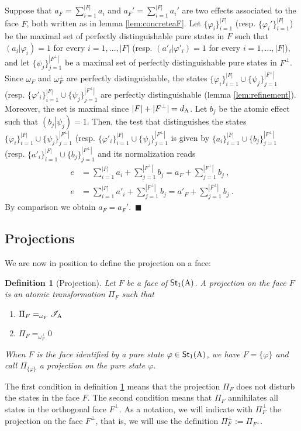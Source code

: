\documentclass[12pt,aps,pra,showpacs,groupedaddress]{revtex4-1}
\newtheorem{definition}{Definition}
\def\Proof{\medskip\par\noindent{\bf Proof. }}
\def\qed{$\,\blacksquare$\par}
\def\Stset{{\mathsf{St}}}
\def\SC#1#2{\left(#1\right|\left.\!#2\right)}  \def\Tr{{\rm Tr}}
\begin{document}
\Proof Suppose that $a_F= \sum_{i=1}^{|F|} a_i$ and $a_F' =
\sum_{i=1}^{|F|} a_i'$ are two effects associated to the face $F$,
both written as in lemma \ref{lem:concreteaF}.  Let
$\{\varphi_i\}_{i=1}^{|F|}$ (resp. $\{\varphi_i'\}_{i=1}^{|F|}$) be
the maximal set of perfectly distinguishable pure states in $F$ such
that $\SC {a_i}{\varphi_i} = 1$ for every $i=1, \dots, |F|$ (resp.
$\SC {a'_i}{\varphi'_i} = 1$ for every $i=1, \dots, |F|$), and let
$\{\psi_j\}_{j=1}^{|F^\perp|}$ be a maximal set of perfectly
distinguishable pure states in $F^\perp$. Since $\omega_F$ and
$\omega_{F}^\perp$ are perfectly distinguishable, the states
$\{\varphi_i\}_{i=1}^{|F| } \cup \{\psi_j\}_{j=1}^{|F^\perp|} $ (resp.
$\{\varphi'_i\}_{i=1}^{|F| } \cup \{\psi_j\}_{j=1}^{|F^\perp|} $ are
perfectly distinguishable (lemma \ref{lem:refinement}).  Moreover, the
set is maximal since $|F| + |F^\perp| = d_{\rm A}$.  Let $b_j$ be the
atomic effect such that $\SC {b_j}{\psi_j} =1$.  Then, the test that
distinguishes the states $\{\varphi_i\}_{i=1}^{|F|} \cup
\{\psi_j\}_{j=1}^{|F^\perp|} $ (resp.  $\{\varphi'_i\}_{i=1}^{|F|}
\cup \{\psi_j\}_{j=1}^{|F^\perp|} $ is given by $\{a_i\}_{i=1}^{|F|}
\cup \{b_j\}_{j=1}^{|F^\perp|} $ (resp.  $\{a'_i\}_{i=1}^{|F|} \cup
\{b_j\}_{j=1}^{|F^\perp|}$ and its normalization reads
\begin{align*}
  e &=  \sum_{i=1}^{|F|}  a_i  + \sum_{j=1}^{|F^\perp|}  b_j  = a_F  +     \sum_{j=1}^{|F^\perp|}  b_j ~,\\
  e & = \sum_{i=1}^{|F|} a'_i + \sum_{j=1}^{|F^\perp|} b_j = a'_F +
  \sum_{j=1}^{|F^\perp|} b_j ~.
\end{align*}
By comparison we obtain $a_F = a_F'$.  \qed
 




\subsection{Projections}
We are now in position to define the projection on a face:
\begin{definition}[Projection]
  Let $F$ be a face of $\Stset_1(\rA)$. A {\em projection} on the face
  $F$ is an atomic transformation $\Pi_F$ such that
  \begin{enumerate}
  \item $\Pi_F=_{\omega_F} \mathscr I_{\rm A}$
  \item $\Pi_{F}=_{\omega^\perp_{F}}0$
  \end{enumerate}
  \label{def:project}
  When $F$ is the  face identified by a pure state $\varphi\in\Stset_1 (\rA)$, we have $F= \{\varphi\}$ and call $\Pi_{\{\varphi\}}$ a \emph{projection on the pure state $\varphi$}.   
\end{definition}
The first condition in definition \ref{def:project} means that the projection $\Pi_F$ does not disturb the states in the face $F$.
The second condition means that $\Pi_{F}$ annihilates all states in the orthogonal face $F^\perp$. As a notation, we will indicate with $\Pi_F^\perp$ the projection on the face $F^\perp$, that is, we will use the definition $\Pi_F^\perp := \Pi_{F^\perp}$.   
\end{document}
